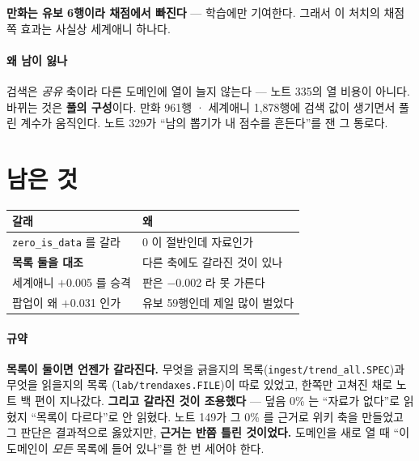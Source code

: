 \documentclass[10pt]{article}
\begin{document}
\textbf{만화는 유보 6행이라 채점에서 빠진다} --- 학습에만 기여한다. 그래서
이 처치의 채점 쪽 효과는 사실상 세계애니 하나다.

\paragraph{왜 남이 잃나} 검색은 \emph{공유} 축이라 다른 도메인에 열이
늘지 않는다 --- 노트 335의 열 비용이 아니다. 바뀌는 것은 \textbf{풀의
구성}이다. 만화 961행 · 세계애니 1,878행에 검색 값이 생기면서 풀린
계수가 움직인다. 노트 329가 ``남의 뽑기가 내 점수를 흔든다''를 잰 그
통로다.

\section{남은 것}
\begin{center}\footnotesize
\begin{tabular}{ll}
\hline
갈래 & 왜 \\
\hline
\texttt{zero\_is\_data} 를 갈라 & 0 이 절반인데 자료인가 \\
\textbf{목록 둘을 대조} & 다른 축에도 갈라진 것이 있나 \\
세계애니 $+$0.005 를 승격 & 판은 $-$0.002 라 못 가른다 \\
팝업이 왜 $+$0.031 인가 & 유보 59행인데 제일 많이 벌었다 \\
\hline
\end{tabular}
\end{center}

\paragraph{규약} \textbf{목록이 둘이면 언젠가 갈라진다.} 무엇을 긁을지의
목록(\texttt{ingest/trend\_all.SPEC})과 무엇을 읽을지의 목록
(\texttt{lab/trendaxes.FILE})이 따로 있었고, 한쪽만 고쳐진 채로 노트 백 편이
지나갔다. \textbf{그리고 갈라진 것이 조용했다} --- 덮음 0\% 는 ``자료가
없다''로 읽혔지 ``목록이 다르다''로 안 읽혔다. 노트 149가 그 0\% 를 근거로
위키 축을 만들었고 그 판단은 결과적으로 옳았지만, \textbf{근거는 반쯤
틀린 것이었다.} 도메인을 새로 열 때 ``이 도메인이 \emph{모든} 목록에
들어 있나''를 한 번 세어야 한다.
\end{document}
